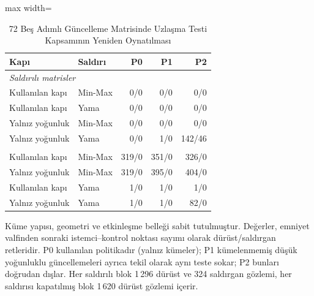 \begin{table}[!t]
\centering\footnotesize
\setlength{\tabcolsep}{4pt}
\caption{72 Beş Adımlı Güncelleme Matrisinde Uzlaşma Testi Kapsamının Yeniden Oynatılması}\label{tab:coverage_replay}
\begin{adjustbox}{max width=\columnwidth}
\begin{tabular}{llrrr}
\toprule
Kapı & Saldırı & P0 & P1 & P2 \\
\midrule
\multicolumn{5}{l}{\emph{Saldırılı matrisler}} \\
\quad Kullanılan kapı & Min-Max & 0/0 & 0/0 & 0/0 \\
\quad Kullanılan kapı & Yama & 0/0 & 0/0 & 0/0 \\
\quad Yalnız yoğunluk & Min-Max & 0/0 & 0/0 & 0/0 \\
\quad Yalnız yoğunluk & Yama & 0/0 & 1/0 & 142/46 \\
\addlinespace[3pt]
\multicolumn{5}{l}{\emph{Saldırısı kapatılmış kontroller}} \\
\quad Kullanılan kapı & Min-Max & 319/0 & 351/0 & 326/0 \\
\quad Yalnız yoğunluk & Min-Max & 319/0 & 395/0 & 404/0 \\
\quad Kullanılan kapı & Yama & 1/0 & 1/0 & 1/0 \\
\quad Yalnız yoğunluk & Yama & 1/0 & 1/0 & 82/0 \\
\bottomrule
\end{tabular}
\end{adjustbox}

\par\vspace{3pt}\parbox{\linewidth}{\footnotesize Küme yapısı, geometri ve etkinleşme belleği sabit tutulmuştur. Değerler, emniyet valfinden sonraki istemci--kontrol noktası sayımı olarak dürüst/saldırgan retleridir. P0 kullanılan politikadır (yalnız kümeler); P1 kümelenmemiş düşük yoğunluklu güncellemeleri ayrıca tekil olarak aynı teste sokar; P2 bunları doğrudan dışlar. Her saldırılı blok 1\,296 dürüst ve 324 saldırgan gözlemi, her saldırısı kapatılmış blok 1\,620 dürüst gözlemi içerir.}
\end{table}
